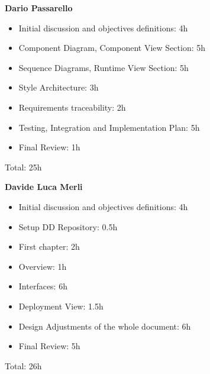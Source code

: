 \textbf{Dario Passarello}
\begin{itemize}
    \item Initial discussion and objectives definitions: 4h
    \item Component Diagram, Component View Section: 5h
    \item Sequence Diagrams, Runtime View Section: 5h
    \item Style Architecture: 3h
    \item Requirements traceability: 2h
    \item Testing, Integration and Implementation Plan: 5h
    \item Final Review: 1h
\end{itemize}

Total: 25h

\bigskip

\textbf{Davide Luca Merli}

\begin{itemize}
    \item Initial discussion and objectives definitions: 4h
    \item Setup DD Repository: 0.5h
    \item First chapter: 2h
    \item Overview: 1h
    \item Interfaces: 6h
    \item Deployment View: 1.5h
    \item Design Adjustments of the whole document: 6h
    \item Final Review: 5h

\end{itemize}

Total: 26h